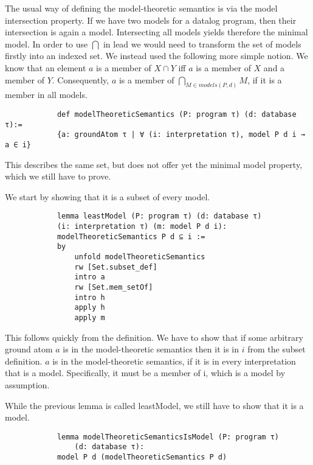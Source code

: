 \documentclass{article}
\begin{document}
        The usual way of defining the model-theoretic semantics is via the model intersection property. If we have two models for a datalog program, then their intersection is again a model. Intersecting all models yields therefore the minimal model. In order to use $\bigcap$ in lead we would need to transform the set of models firstly into an indexed set. We instead used the following more simple notion. We know that an element $a$ is a member of $X \cap Y$ iff $a$ is a member of $X$ and a member of $Y$. Consequently, $a$ is a member of $\bigcap_{M \in models(P,d)} M $, if it is a member in all models.

        \begin{lstlisting}
            def modelTheoreticSemantics (P: program τ) (d: database τ):= 
            {a: groundAtom τ | ∀ (i: interpretation τ), model P d i → a ∈ i}
        \end{lstlisting}

        This describes the same set, but does not offer yet the minimal model property, which we still have to prove.

        We start by showing that it is a subset of every model.
        \begin{lstlisting}    
            lemma leastModel (P: program τ) (d: database τ) 
            (i: interpretation τ) (m: model P d i): 
            modelTheoreticSemantics P d ⊆ i :=
            by
                unfold modelTheoreticSemantics
                rw [Set.subset_def]
                intro a
                rw [Set.mem_setOf]
                intro h
                apply h
                apply m
        \end{lstlisting}

        This follows quickly from the definition. We have to show that if some arbitrary ground atom $a$ is in the model-theoretic semantics then it is in $i$ from the subset definition. $a$ is in the model-theoretic semantics, if it is in every interpretation that is a model. Specifically, it must be a member of i, which is a model by assumption.

        While the previous lemma is called leastModel, we still have to show that it is a model.

        \begin{lstlisting}
            lemma modelTheoreticSemanticsIsModel (P: program τ) 
                (d: database τ): 
            model P d (modelTheoreticSemantics P d)
        \end{lstlisting}
\end{document}
